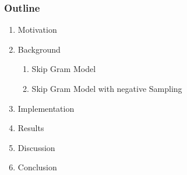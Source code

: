 \begin{frame}\frametitle{Outline}
\begin{enumerate}
\item Motivation
\item Background
\begin{enumerate}
\item Skip Gram Model
\item Skip Gram Model with negative Sampling
\end{enumerate}
\item Implementation
\item Results
\item Discussion
\item Conclusion
\end{enumerate}
	
\end{frame}